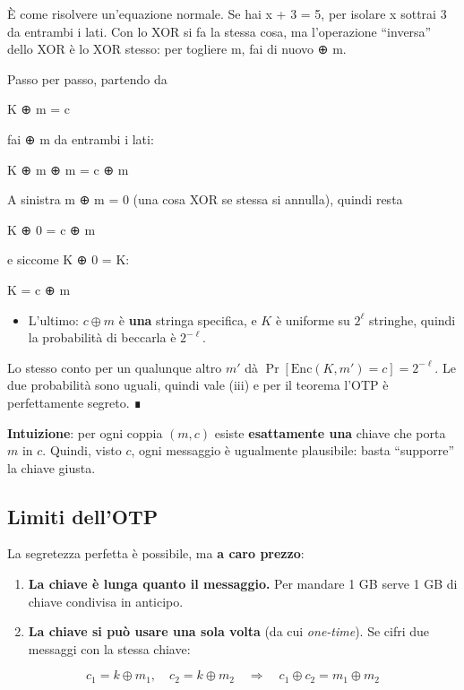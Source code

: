 È come risolvere un'equazione normale. Se hai x + 3 = 5, per isolare x sottrai 3 da entrambi i lati. Con lo XOR si fa la stessa cosa, ma l'operazione ``inversa'' dello XOR è lo XOR stesso: per togliere m, fai di nuovo ⊕ m.

Passo per passo, partendo da

K ⊕ m = c

fai ⊕ m da entrambi i lati:

K ⊕ m ⊕ m = c ⊕ m

A sinistra m ⊕ m = 0 (una cosa XOR se stessa si annulla), quindi resta

K ⊕ 0 = c ⊕ m

e siccome K ⊕ 0 = K:

K = c ⊕ m

\begin{itemize}
\tightlist
\item
  L'ultimo: \(c \oplus m\) è \textbf{una} stringa specifica, e \(K\) è uniforme su \(2^\ell\) stringhe, quindi la probabilità di beccarla è \(2^{-\ell}\).
\end{itemize}

Lo stesso conto per un qualunque altro \(m'\) dà \(\Pr[\text{Enc}(K, m') = c] = 2^{-\ell}\). Le due probabilità sono uguali, quindi vale (iii) e per il teorema l'OTP è perfettamente segreto. ∎

\textbf{Intuizione}: per ogni coppia \((m, c)\) esiste \textbf{esattamente una} chiave che porta \(m\) in \(c\). Quindi, visto \(c\), ogni messaggio è ugualmente plausibile: basta ``supporre'' la chiave giusta.

\subsection{Limiti dell'OTP}

La segretezza perfetta è possibile, ma \textbf{a caro prezzo}:

\begin{enumerate}
\def\labelenumi{\arabic{enumi}.}
\tightlist
\item
  \textbf{La chiave è lunga quanto il messaggio.} Per mandare 1 GB serve 1 GB di chiave condivisa in anticipo.
\item
  \textbf{La chiave si può usare una sola volta} (da cui \emph{one-time}). Se cifri due messaggi con la stessa chiave:
\end{enumerate}

\[
c_1 = k \oplus m_1, \quad c_2 = k \oplus m_2 \quad\Rightarrow\quad c_1 \oplus c_2 = m_1 \oplus m_2
\]

